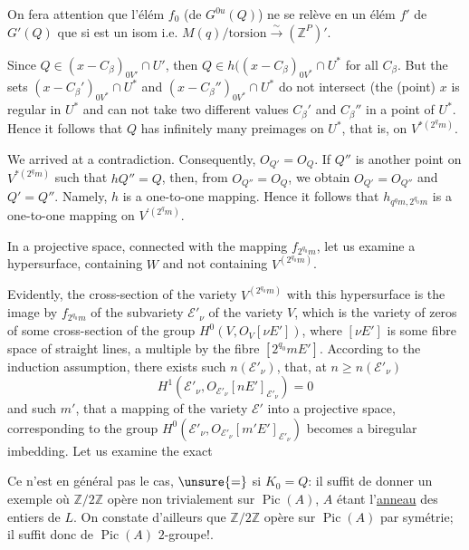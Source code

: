 On fera attention que l'élém $f_0$  (de $G^{0u}(Q)$) ne se relève en un élém  $f'$ de $G'(Q)$ que si \inserted{$\varphi$} est un isom i.e. $M(q)/\text{torsion}\xrightarrow{\sim}(\mathbb Z^P)'$.

Since $Q\in(x-C_\beta)_{0V'}\cap U'$, then $Q\in h((x-C_\beta)_{0V^*}\cap U^*$ for all $C_\beta$. But the sets $(x-C_\beta')_{0V^*}\cap U^*$ and $(x-C_\beta'')_{0V^*}\cap U^*$ do not intersect (the (point) $x$ is regular in $U^*$ and can not take two different values $C_\beta'$ and $C_\beta''$ in a point of $U^*$. Hence it follows that $Q$ has infinitely many preimages on $U^*$, that is, on $V^{*(2^qm)}$.

We arrived at a contradiction. Consequently, $O_{Q'}=O_Q$. If $Q''$ is another point on $V^{*(2^qm)}$ such that $hQ''=Q$, then, from $O_{Q''}=O_Q$, we obtain $O_{Q'}=O_{Q''}$ and $Q'=Q''$. Namely, $h$ is a one-to-one mapping. Hence it follows that $h_{q^qm,2^{q_0}m}$ is a one-to-one mapping on $V^{\prime(2^qm)}$.

In a projective space, connected with the mapping $f_{2^{q_0}m}$, let us examine a hypersurface, containing $W$ and not containing $V^{(2^{q_0}m)}$.

Evidently, the cross-section of the variety $V^{(2^{q_0}m)}$ with this hypersurface is the image by $f_{2^{q_0}m}$ of the subvariety $\mathcal E'_\nu$ of the variety $V$, which is the variety of zeros of some cross-section of the group $H^0(V,O_V[\nu E'])$,  where $[\nu E']$ is some fibre space of straight lines, a multiple by the fibre $[2^{q_0}mE']$. According to the induction assumption, there exists such $n(\mathcal E'_\nu)$, that, at $n\ge n(\mathcal E'_\nu)$
\[
H^1(\mathcal E'_\nu,O_{\mathcal E'_\nu}[nE']_{\mathcal E'_\nu})=0
\]
and such $m'$, that a mapping of the variety $\mathcal E'$ into a projective space, corresponding to the group $H^0(\mathcal E'_\nu,O_{\mathcal E'_\nu}[m'E']_{\mathcal E'_\nu})$ becomes a biregular imbedding. Let us examine the exact

Ce n'est en général pas le cas, $\unsure{=}$ si $K_0=Q$: il suffit de donner un exemple où $\mathbb Z/2\mathbb Z$ opère non trivialement sur $\operatorname{Pic}(A)$, $A$ étant l'\uline{anneau}  des entiers de $L$. On constate d'ailleurs que $\mathbb Z/2\mathbb Z$ opère sur $\operatorname{Pic}(A)$ par symétrie; il suffit donc de  $\operatorname{Pic}(A)$  $2$-groupe!.


